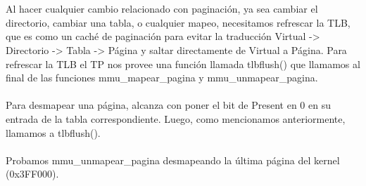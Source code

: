 \documentclass[10pt,a4paper,spanish]{article}
\begin{document}
\\ \\
Al hacer cualquier cambio relacionado con paginación, ya sea cambiar el directorio, cambiar una tabla, o cualquier mapeo, necesitamos refrescar la TLB, que es como un caché de paginación para evitar la traducción Virtual -> Directorio -> Tabla -> Página y saltar directamente de Virtual a Página. Para refrescar la TLB el TP nos provee una función llamada tlbflush() que llamamos al final de las funciones mmu\_mapear\_pagina y mmu\_unmapear\_pagina.
\\ \\
Para desmapear una página, alcanza con poner el bit de Present en 0 en su entrada de la tabla correspondiente. Luego, como mencionamos anteriormente, llamamos a tlbflush().
\\ \\
Probamos mmu\_unmapear\_pagina desmapeando la última página del kernel (0x3FF000).
\end{document}
